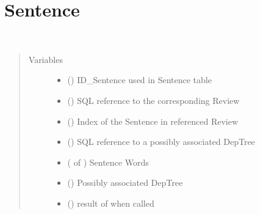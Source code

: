 \documentclass[letterpaper,10pt,english]{sphinxmanual}
\begin{document}
\section{Sentence}
\label{\detokenize{index:sentence}}

\begin{fulllineitems}
\label{\detokenize{index:loacore.classes.classes.Sentence}}~\begin{quote}\begin{description}
\item[{Variables}] \leavevmode\begin{itemize}
\item {} 
 () \textendash{} ID\_Sentence used in Sentence table

\item {} 
 () \textendash{} SQL reference to the corresponding Review

\item {} 
 () \textendash{} Index of the Sentence in referenced Review

\item {} 
 () \textendash{} SQL reference to a possibly associated DepTree

\item {} 
 ( of {\hyperref[\detokenize{index:loacore.classes.classes.Word}]{}}) \textendash{} Sentence Words

\item {} 
 ({\hyperref[\detokenize{index:loacore.classes.classes.DepTree}]{}}) \textendash{} Possibly associated DepTree

\item {} 
 () \textendash{} result of {\hyperref[\detokenize{index:loacore.classes.classes.Sentence.compute_freeling_sentence}]{}} when called


\end{itemize}
\end{description}
\end{quote}
\end{fulllineitems}
\end{document}
